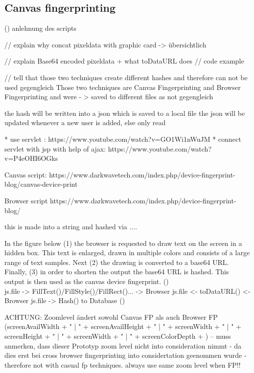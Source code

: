 \subsection{Canvas fingerprinting}


(\textcite{jkula17}) anlehnung des scripts

// explain why concat pixeldata with graphic card -> übersichtlich

// explain Base64 encoded pixeldata + what toDataURL does
// code example

// tell that those two techniques create different hashes and therefore can not be used gegengleich
Those two techniques are Canvas Fingerprinting and Browser Fingerprinting and were - > saved to different files as not gegengleich

the hash will be written into a json which is saved to a local file
the json will be updated whenever a new user is added, else only read

* use servlet : https://www.youtube.com/watch?v=GO1Wi1nWuJM
* connect servlet with jsp with help of ajax: https://www.youtube.com/watch?v=P4eOHI6OGks

Canvas script:
https://www.darkwavetech.com/index.php/device-fingerprint-blog/canvas-device-print

Browser script
https://www.darkwavetech.com/index.php/device-fingerprint-blog/



this is made into a string and hashed via ....
 
 In the figure below (1) the browser is requested to draw text on the screen in a hidden box. This text is enlarged, drawn in multiple colors and consists of a large range of text samples. Next (2) the drawing is converted to a base64 URL. Finally, (3) in order to shorten the output the base64 URL is hashed. This output is then used as the canvas device fingerprint. 
 (\textcite{jkula17})\\
 
 js.file -> FillText()/FillStyle()/FillRect()... -> Browser
 js.file <- toDataURL() <- Browser
 js.file -> Hash() to Database
 (\textcite{jkula17})
 
 
ACHTUNG:
Zoomlevel ändert sowohl Canvas FP als auch Browser FP (screenAvailWidth + " | " + screenAvailHeight + " | " + screenWidth + " | " + screenHeight + " | " +
screenWidth + " | " + screenColorDepth + )
-- muss anmerken, dass dieser Prototyp zoom level nicht into consideration nimmt - da dies erst bei cross browser fingerprinting into considertation geenommen wurde - therefore not with casual fp techniques. always use same zoom level when FP!!

